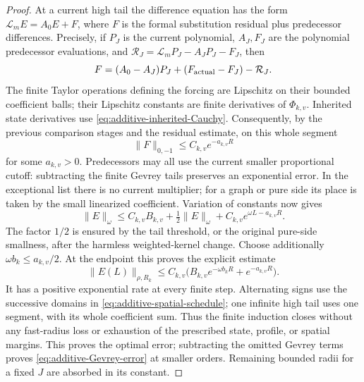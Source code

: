 \begin{proof}
At a current high tail the difference equation has the form
$\mathcal L_mE=A_0E+F$, where $F$ is the formal substitution residual
plus predecessor differences.  Precisely, if $P_J$ is the current
polynomial, $A_J,F_J$ are the polynomial predecessor evaluations, and
$\mathcal R_J=\mathcal L_mP_J-A_JP_J-F_J$, then
\[
 F=(A_0-A_J)P_J+(F_{\rm actual}-F_J)-\mathcal R_J.
\]
The finite Taylor operations defining
the forcing are Lipschitz on their bounded coefficient balls; their
Lipschitz constants are finite derivatives of $\Phi_{k,v}$.
Inherited state derivatives use
\eqref{eq:additive-inherited-Cauchy}.  Consequently, by the previous
comparison stages and the residual estimate, on this whole segment
\[
 \|F\|_{0,-1}\le C_{k,v}e^{-a_{k,v}R}
\]
for some $a_{k,v}>0$.  Predecessors may all use the current smaller
proportional cutoff: subtracting the finite Gevrey tails preserves
an exponential error.  In the exceptional list there is no current
multiplier; for a graph or pure side its place is taken by the small
linearized coefficient.  Variation of constants now gives
\begin{equation}\label{eq:additive-actual-induction}
 \|E\|_\omega\le C_{k,v}B_{k,v}
       +\tfrac12\|E\|_\omega
       +C_{k,v}e^{\omega L-a_{k,v}R}.
\end{equation}
The factor $1/2$ is ensured by the tail threshold, or the original
pure-side smallness, after the harmless weighted-kernel change.
Choose additionally $\omega b_k\le a_{k,v}/2$.  At the endpoint this
proves the explicit estimate
\begin{equation}\label{eq:additive-actual-endpoint}
 \|E(L)\|_{\rho,R_k}\le
 C_{k,v}\bigl(B_{k,v}e^{-\omega b_kR}+e^{-a_{k,v}R}\bigr).
\end{equation}
It has a positive exponential rate at every finite step.  Alternating
signs use the successive domains in
\eqref{eq:additive-spatial-schedule}; one infinite high tail uses one
segment, with its whole coefficient sum.  Thus the finite induction
closes without any fast-radius loss or exhaustion of the prescribed
state, profile, or spatial margins.  This proves the optimal error;
subtracting the omitted Gevrey terms proves
\eqref{eq:additive-Gevrey-error} at smaller orders.  Remaining bounded
radii for a fixed $J$ are absorbed in its constant.


\end{proof}
